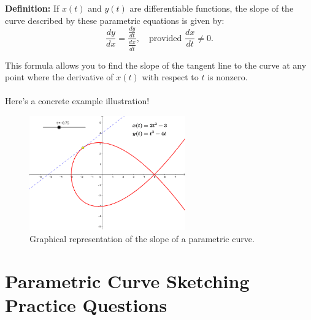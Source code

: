 \documentclass{article}
\begin{document}
\begin{definitionbox}
\textbf{Definition:} If \( x(t) \) and \( y(t) \) are differentiable functions, the slope of the curve described by these parametric equations is given by:  
\[
\frac{dy}{dx} = \frac{\frac{dy}{dt}}{\frac{dx}{dt}}, \quad \text{provided } \frac{dx}{dt} \neq 0.
\]
\begin{remarkbox}
    This formula allows you to find the slope of the tangent line to the curve at any point where the derivative of \( x(t) \) with respect to \( t \) is nonzero. \\
    \\
    Here's a concrete example illustration!
    \begin{figure}[H]
        \centering
        \includegraphics[width=0.6\textwidth]{slopeparametricexample.png}
        \caption{Graphical representation of the slope of a parametric curve.}
        \label{fig:slopeparametricexample}
    \end{figure}
\end{remarkbox}
\end{definitionbox}

\section*{Parametric Curve Sketching Practice Questions}
\end{document}
